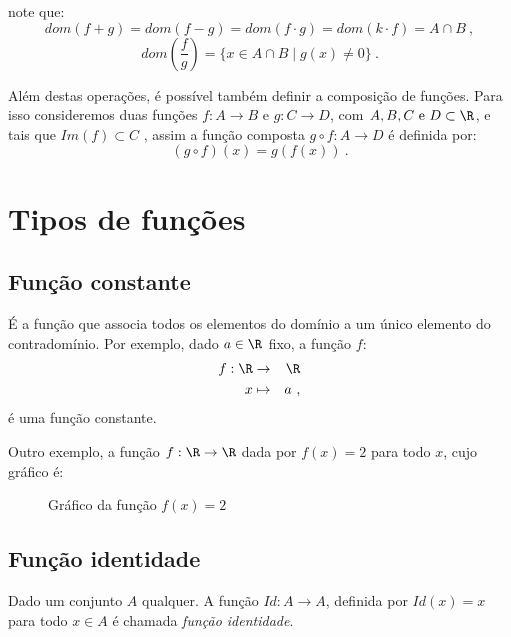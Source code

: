 note que:
\[dom(f+g)= dom(f-g)= dom(f \cdot g)= dom(k \cdot f)= A \cap B \ ,\]
\[ dom\left( \frac{f}{g} \right)= \{x \in A \cap B \mid g(x) \neq 0\} \ . \]

Além destas operações, é possível também definir a composição de funções. Para isso consideremos duas funções $f: A \rightarrow B$ e $g: C \rightarrow D$, com $A, B, C \text{ e } D \subset \R$, e tais que $Im(f) \subset C$ , assim a função composta $g \circ f: A \rightarrow D$ é definida por:
\[(g \circ f)(x)= g(f(x)) \ . \]

\section{Tipos de funções}

\subsection{Função constante}

É a função que associa todos os elementos do domínio a um único elemento do contradomínio. Por exemplo, dado $a \in \R$ fixo, a função $f$:
\begin{eqnarray*}
 f: \R & \rightarrow & \R \\
 x & \mapsto & a \ ,
\end{eqnarray*}
é uma função constante.

Outro exemplo, a função $f: \R \rightarrow \R$ dada por $f(x)= 2$ para todo $x$, cujo gráfico é:
\begin{figure}[H]
 \centering
    \caption{Gráfico da função $f(x)=2$}
  \end{figure}

\subsection{Função identidade}

Dado um conjunto $A$ qualquer. A função $Id: A \rightarrow A$, definida por $Id(x)= x$ para todo $x \in A$ é chamada \textit{função identidade}.

